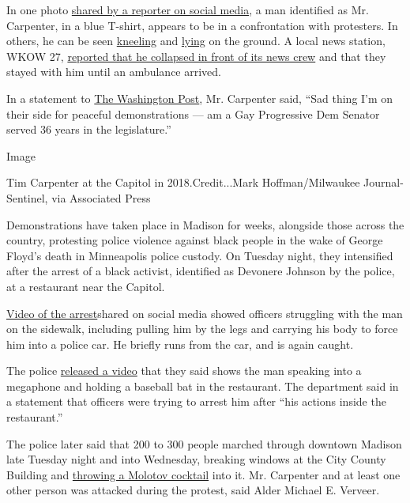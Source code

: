 In one photo
\href{https://twitter.com/telldylan/status/1275657586377965576}{shared
by a reporter on social media}, a man identified as Mr. Carpenter, in a
blue T-shirt, appears to be in a confrontation with protesters. In
others, he can be seen
\href{https://twitter.com/lawrencegandrea/status/1275658434348748800}{kneeling}
and
\href{https://twitter.com/lanceveeser/status/1275664180994080768}{lying}
on the ground. A local news station, WKOW 27,
\href{https://wkow.com/2020/06/24/watch-senator-shares-video-showing-attack/}{reported
that he collapsed in front of its news crew} and that they stayed with
him until an ambulance arrived.

In a statement to
\href{https://www.washingtonpost.com/nation/2020/06/24/madison-police-protest-senator/}{The
Washington Post}, Mr. Carpenter said, ``Sad thing I'm on their side for
peaceful demonstrations --- am a Gay Progressive Dem Senator served 36
years in the legislature.''

Image

Tim Carpenter at the Capitol in 2018.Credit...Mark Hoffman/Milwaukee
Journal-Sentinel, via Associated Press

Demonstrations have taken place in Madison for weeks, alongside those
across the country, protesting police violence against black people in
the wake of George Floyd's death in Minneapolis police custody. On
Tuesday night, they intensified after the arrest of a black activist,
identified as Devonere Johnson by the police, at a restaurant near the
Capitol.

\href{https://www.facebookcorewwwi.onion/100003369941337/videos/pcb.2877429162379387/2877427369046233}{Video
of the arrest}shared on social media showed officers struggling with the
man on the sidewalk, including pulling him by the legs and carrying his
body to force him into a police car. He briefly runs from the car, and
is again caught.

The police
\href{https://www.youtube.com/watch?v=vSgI0vCoLMY\&feature=youtu.be}{released
a video} that they said shows the man speaking into a megaphone and
holding a baseball bat in the restaurant. The department said in a
statement that officers were trying to arrest him after ``his actions
inside the restaurant.''

The police later said that 200 to 300 people marched through downtown
Madison late Tuesday night and into Wednesday, breaking windows at the
City County Building and
\href{https://www.cityofmadison.com/police/newsroom/incidentreports/incident.cfm?id=26631}{throwing
a Molotov cocktail} into it. Mr. Carpenter and at least one other person
was attacked during the protest, said Alder Michael E. Verveer.


